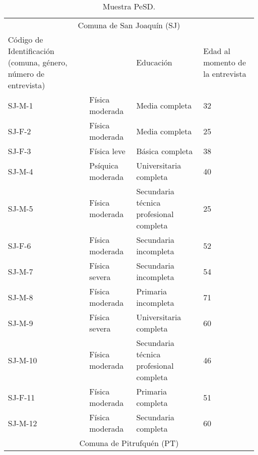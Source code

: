 \begin{table}[htpb]
\centering
\small
\begin{threeparttable}
\caption{Muestra PeSD.}\label{tab-01}
\begin{tabular}{l>{\raggedright}p{}>{\raggedright}p{}l}
\toprule
\multicolumn{4}{c}{Comuna de San Joaquín (SJ)}\\
\multicolumn{1}{p{0.2\textwidth}}{Código de Identificación (comuna, género, número de entrevista)} &
\multicolumn{1}{p{0.2\textwidth}}{Situación de Discapacidad} &
Educación & 
\multicolumn{1}{p{0.2\textwidth}}{Edad al momento de la entrevista} \\
\midrule
SJ-M-1 & Física moderada & Media completa & 32 \\
SJ-F-2 & Física moderada & Media completa & 25 \\
SJ-F-3 & Física leve & Básica completa & 38 \\
SJ-M-4 & Psíquica moderada & Universitaria completa & 40 \\
SJ-M-5 & Física moderada & Secundaria técnica profesional completa &
25 \\
SJ-F-6 & Física moderada & Secundaria incompleta & 52 \\
SJ-M-7 & Física severa & Secundaria incompleta & 54 \\
SJ-M-8 & Física moderada & Primaria incompleta & 71 \\
SJ-M-9 & Física severa & Universitaria completa & 60 \\
SJ-M-10 & Física moderada & Secundaria técnica profesional completa &
46 \\
SJ-F-11 & Física moderada & Primaria completa & 51 \\
SJ-M-12 & Física moderada & Secundaria completa & 60 \\

\midrule
\multicolumn{4}{c}{Comuna de Pitrufquén (PT)} \\
 

\end{tabular}
\end{threeparttable}
\end{table}
